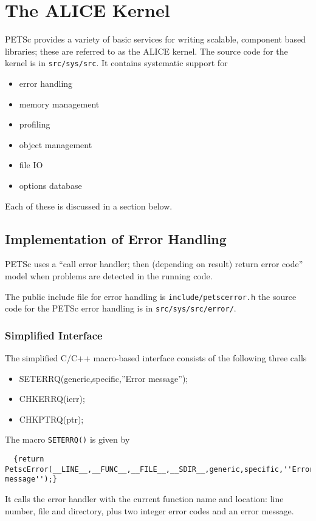 \chapter{The ALICE Kernel}
\label{chapter:kernel}
PETSc provides a variety of basic services for writing scalable, component 
based libraries; these are referred to as the ALICE kernel. The source
code for the kernel is in {\tt src/sys/src}. It contains systematic support for
\begin{itemize}
  \item error handling
  \item memory management
  \item profiling
  \item object management
  \item file IO
  \item options database
\end{itemize}
Each of these is discussed in a section below.

\section{Implementation of Error Handling}

PETSc  uses a ``call error handler; then (depending on result) return
error code'' model when problems are detected in the running code. 

The public include file for error handling is {\tt include/petscerror.h} the 
source code for the PETSc error handling is in  
{\tt src/sys/src/error/}.

\subsection{Simplified Interface}

The simplified C/C++ macro-based interface consists of the following three calls
\begin{itemize}
\item SETERRQ(generic,specific,''Error message'');
\item CHKERRQ(ierr);
\item CHKPTRQ(ptr);
\end{itemize}

The macro {\tt SETERRQ()} is given by 
\begin{verbatim}
  {return PetscError(__LINE__,__FUNC__,__FILE__,__SDIR__,generic,specific,''Error message'');}
\end{verbatim}
It calls the error handler with the current function name and location: line number,
file and directory, plus two integer error codes and an error message.

